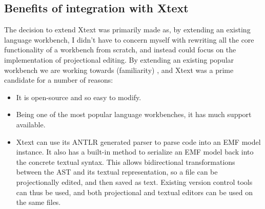 \documentclass{article}
\begin{document}
\subsection{Benefits of integration with Xtext}\label{integrationWithXtext}
The decision to extend Xtext was primarily made as, by extending an existing language workbench, I didn't have to concern myself with rewriting all the core functionality of a workbench from scratch, and instead could focus on the implementation of projectional editing. By extending an existing popular workbench we are working towards \RFamiliarity (familiarity) , and Xtext was a prime candidate for a number of reasons:
\begin{itemize}
\item It is open-source and so easy to modify.
\item Being one of the most popular language workbenches, it has much support available.
\item Xtext can use its ANTLR generated parser to parse code into an EMF model instance. It also has a built-in method to serialize an EMF model back into the concrete textual syntax. This allows bidirectional transformations between the AST and its textual representation, so a file can be projectionally edited, and then saved as text. Existing version control tools can thus be used, and both projectional and textual editors can be used on the same files.
\end{itemize}
\end{document}
